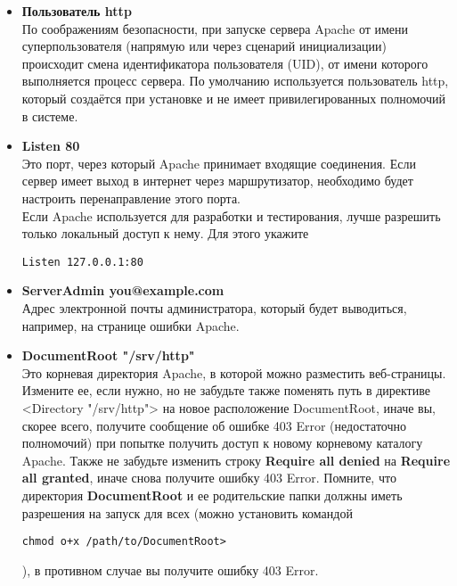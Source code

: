 \documentclass[a4paper,10pt,twoside]{article}
\begin{document}
\begin{itemize}
 \item \textbf{Пользователь http}\\
По соображениям безопасности, при запуске сервера Apache от имени суперпользователя (напрямую или через сценарий инициализации) происходит смена идентификатора пользователя (UID), от имени которого выполняется процесс сервера. По умолчанию используется пользователь http, который создаётся при установке и не имеет привилегированных полномочий в системе.
\item \textbf{Listen 80}\\
Это порт, через который Apache принимает входящие соединения. Если сервер имеет выход в интернет через маршрутизатор, необходимо будет настроить перенаправление этого порта.\\
Если Apache используется для разработки и тестирования, лучше разрешить только локальный доступ к нему. Для этого укажите \begin{verbatim}
Listen 127.0.0.1:80                                                                                                                          \end{verbatim}
\item \textbf{ServerAdmin you@example.com}\\
Адрес электронной почты администратора, который будет выводиться, например, на странице ошибки Apache.
\item \textbf{DocumentRoot "/srv/http"}\\
Это корневая директория Apache, в которой можно разместить веб-страницы.\\
Измените ее, если нужно, но не забудьте также поменять путь в директиве <Directory "/srv/http"> на новое расположение DocumentRoot, иначе вы, скорее всего, получите сообщение об ошибке 403 Error (недостаточно полномочий) при попытке получить доступ к новому корневому каталогу Apache. Также не забудьте изменить строку \textbf{Require all denied} на \textbf{Require all granted}, иначе снова получите ошибку 403 Error. Помните, что директория \textbf{DocumentRoot} и ее родительские папки должны иметь разрешения на запуск для всех (можно установить командой 
\begin{verbatim}
chmod o+x /path/to/DocumentRoot>                                                                                                                                                                                                                                                                                                                                                                                                                                                                                                                                                                                                               \end{verbatim} ), в противном случае вы получите ошибку 403 Error.

\end{itemize}
\end{document}

